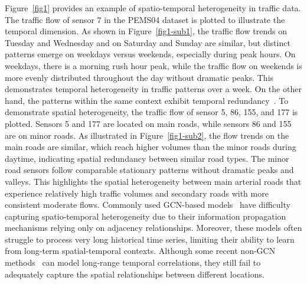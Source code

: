\documentclass[letterpaper]{article} \usepackage{aaai24}  \usepackage{times}  \usepackage{helvet}  \usepackage{courier}  \usepackage[hyphens]{url}  \usepackage{graphicx} \urlstyle{rm} \def\UrlFont{\rm}  \usepackage{natbib}  \usepackage{caption} \frenchspacing  \setlength{\pdfpagewidth}{8.5in} \setlength{\pdfpageheight}{11in} \usepackage{algorithm}
\begin{document}
Figure~\ref{fig1} provides an example of spatio-temporal heterogeneity in traffic data. The traffic flow of sensor 7 in the PEMS04 dataset is plotted to illustrate the temporal dimension. As shown in Figure~\ref{fig1-sub1}, the traffic flow trends on Tuesday and Wednesday and on Saturday and Sunday are similar, but distinct patterns emerge on weekdays versus weekends, especially during peak hours. On weekdays, there is a morning rush hour peak, while the traffic flow on weekends is more evenly distributed throughout the day without dramatic peaks. This demonstrates temporal heterogeneity in traffic patterns over a week. On the other hand, the patterns within the same context exhibit temporal redundancy~\cite{he2022masked}. To demonstrate spatial heterogeneity, the traffic flow of sensor 5, 86, 155, and 177 is plotted. Sensors 5 and 177 are located on main roads, while sensors 86 and 155 are on minor roads. As illustrated in Figure~\ref{fig1-sub2}, the flow trends on the main roads are similar, which reach higher volumes than the minor roads during daytime, indicating spatial redundancy between similar road types. The minor road sensors follow comparable stationary patterns without dramatic peaks and valleys. This highlights the spatial heterogeneity between main arterial roads that experience relatively high traffic volumes and secondary roads with more consistent moderate flows. Commonly used GCN-based models~\cite{li2018diffusion, yu2018spatio, bai2020adaptive} have difficulty capturing spatio-temporal heterogeneity due to their information propagation mechanisms relying only on adjacency relationships. Moreover, these models often struggle to process very long historical time series, limiting their ability to learn from long-term spatial-temporal contexts. Although some recent non-GCN methods~\cite{shao2022pre, zhou2021informer, wu2021autoformer} can model long-range temporal correlations, they still fail to adequately capture the spatial relationships between different locations.
\end{document}

